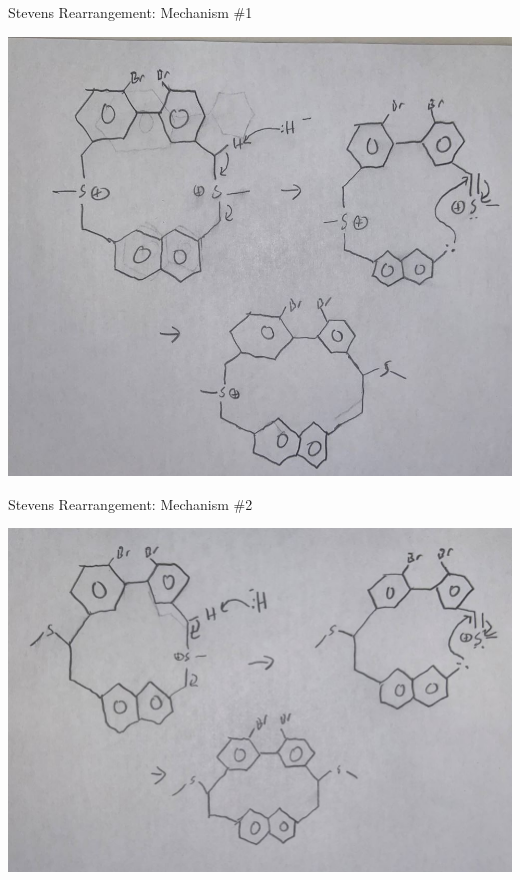 \documentclass[notes]{beamer}
\begin{document}
\begin{frame}{Stevens Rearrangement: Mechanism \#1}
\begin{center}
    \includegraphics[scale=.32]{stevens_rearrangement_one.JPG}
\end{center}
\end{frame}

\begin{frame}{Stevens Rearrangement: Mechanism \#2}
\begin{center}
    \includegraphics[scale=.37]{stevens_rearrangement_Two.JPG}
\end{center}
\end{frame}
\end{document}
